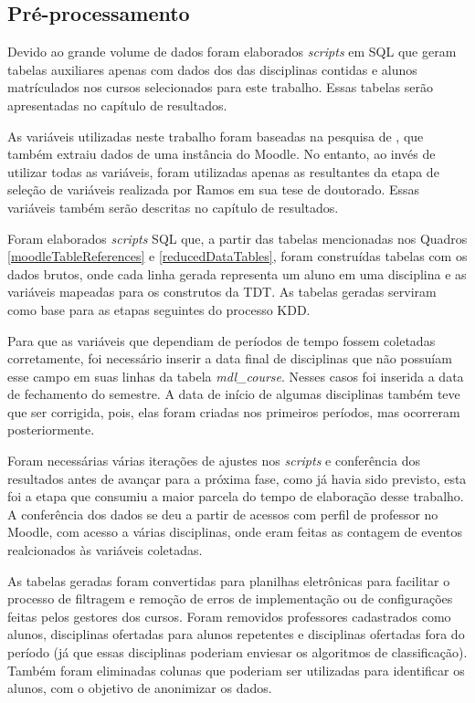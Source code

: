 \subsection{Pré-processamento}

Devido ao grande volume de dados foram elaborados \textit{scripts} em SQL que
geram tabelas auxiliares apenas com dados dos das disciplinas contidas e alunos
matrículados nos cursos selecionados para este trabalho. Essas tabelas serão
apresentadas no capítulo de resultados.

As variáveis utilizadas neste trabalho foram baseadas na pesquisa de
, que também extraiu dados de uma instância do
Moodle. No entanto, ao invés de utilizar todas as variáveis, foram utilizadas
apenas as resultantes da etapa de seleção de variáveis realizada por Ramos em
sua tese de doutorado. Essas variáveis também serão descritas no capítulo de
resultados.

Foram elaborados \textit{scripts} SQL que, a partir das tabelas mencionadas
nos Quadros \ref{moodleTableReferences} e \ref{reducedDataTables}, foram construídas
tabelas com os dados brutos, onde cada linha gerada representa um aluno em uma
disciplina e as variáveis mapeadas para os construtos da TDT. As tabelas geradas
serviram como base para as etapas seguintes do processo KDD.

Para que as variáveis que dependiam de períodos de tempo fossem coletadas
corretamente, foi necessário inserir a data final de disciplinas que não
possuíam esse campo em suas linhas da tabela \textit{mdl\_course}. Nesses casos foi
inserida a data de fechamento do semestre. A data de início de algumas
disciplinas também teve que ser corrigida, pois, elas foram criadas nos
primeiros períodos, mas ocorreram posteriormente.

Foram necessárias várias iterações de ajustes nos \textit{scripts} e conferência
dos resultados antes de avançar para a próxima fase, como já havia sido
previsto, esta foi a etapa que consumiu a maior parcela do tempo de elaboração
desse trabalho. A conferência dos dados se deu a partir de acessos com perfil de professor
no Moodle, com acesso a várias disciplinas, onde eram feitas as contagem de eventos realcionados
às variáveis coletadas.

As tabelas geradas foram convertidas para planilhas eletrônicas para facilitar o
processo de filtragem e remoção de erros de implementação ou de configurações
feitas pelos gestores dos cursos. Foram removidos professores cadastrados como
alunos, disciplinas ofertadas para alunos repetentes e disciplinas ofertadas
fora do período (já que essas disciplinas poderiam enviesar os algoritmos de
classificação). Também foram eliminadas colunas que poderiam ser utilizadas para
identificar os alunos, com o objetivo de anonimizar os dados.

